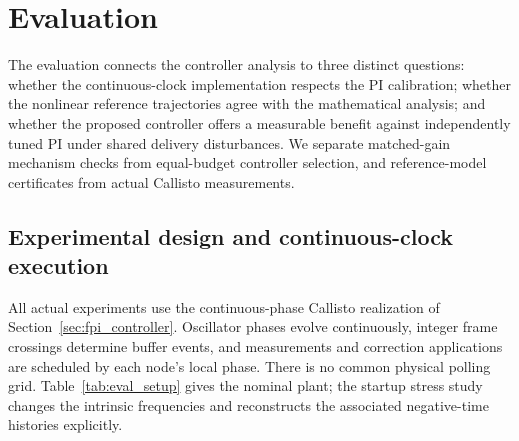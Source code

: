 \section{Evaluation}
\label{sec:evaluation}

The evaluation connects the controller analysis to three distinct questions:
whether the continuous-clock implementation respects the PI calibration;
whether the nonlinear reference trajectories agree with the mathematical
analysis; and whether the proposed controller offers a measurable benefit
against independently tuned PI under shared delivery disturbances. We
separate matched-gain mechanism checks from equal-budget controller
selection, and reference-model certificates from actual Callisto measurements.

\subsection{Experimental design and continuous-clock execution}
\label{subsec:eval_design}

All actual experiments use the continuous-phase Callisto realization of
Section~\ref{sec:fpi_controller}. Oscillator phases evolve continuously,
integer frame crossings determine buffer events, and measurements and
correction applications are scheduled by each node's local phase. There
is no common physical polling grid. Table~\ref{tab:eval_setup} gives the
nominal plant; the startup stress study changes the intrinsic frequencies
and reconstructs the associated negative-time histories explicitly.

